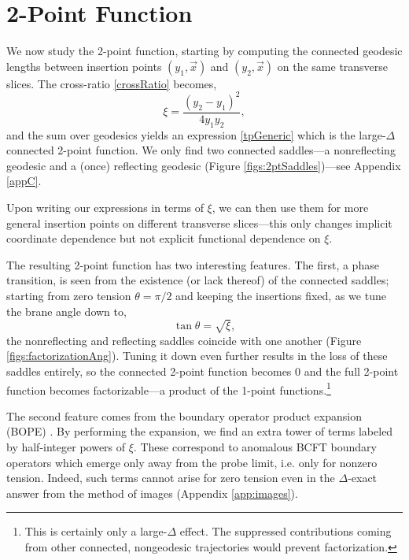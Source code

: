 \documentclass[reprint,amsmath,amssymb,aps,nofootinbib,twocolumn]{revtex4-2}
\begin{document}
\section{2-Point Function}\label{sec:2point}

We now study the 2-point function, starting by computing the connected geodesic lengths between insertion points $(y_1,\vec{x})$ and $(y_2,\vec{x})$ on the same transverse slices. The cross-ratio \eqref{crossRatio} becomes,
\begin{equation}
\xi = \frac{(y_2 - y_1)^2}{4y_1 y_2},\label{crossCons}
\end{equation}
and the sum over geodesics yields an expression \eqref{tpGeneric} which is the large-$\Delta$ connected 2-point function. We only find two connected saddles---a nonreflecting geodesic and a (once) reflecting geodesic (Figure \ref{figs:2ptSaddles})---see Appendix \ref{appC}.

Upon writing our expressions in terms of $\xi$, we can then use them for more general insertion points on different transverse slices---this only changes implicit coordinate dependence but not explicit functional dependence on $\xi$.

The resulting 2-point function has two interesting features. The first, a phase transition, is seen from the existence (or lack thereof) of the connected saddles; starting from zero tension $\theta = \pi/2$ and keeping the insertions fixed, as we tune the brane angle down to,
\begin{equation}
\tan\theta = \sqrt{\xi},
\end{equation}
the nonreflecting and reflecting saddles coincide with one another (Figure \ref{figs:factorizationAng}). Tuning it down even further results in the loss of these saddles entirely, so the connected 2-point function becomes $0$ and the full 2-point function becomes factorizable---a product of the 1-point functions.\footnote{This is certainly only a large-$\Delta$ effect. The suppressed contributions coming from other connected, nongeodesic trajectories would prevent factorization.}

The second feature comes from the boundary operator product expansion (BOPE) \cite{McAvity:1995zd,Karch:2017fuh}. By performing the expansion, we find an extra tower of terms labeled by half-integer powers of $\xi$. These correspond to anomalous BCFT boundary operators which emerge only away from the probe limit, i.e. only for nonzero tension. Indeed, such terms cannot arise for zero tension even in the $\Delta$-exact answer from the method of images (Appendix \ref{app:images}).
\end{document}
